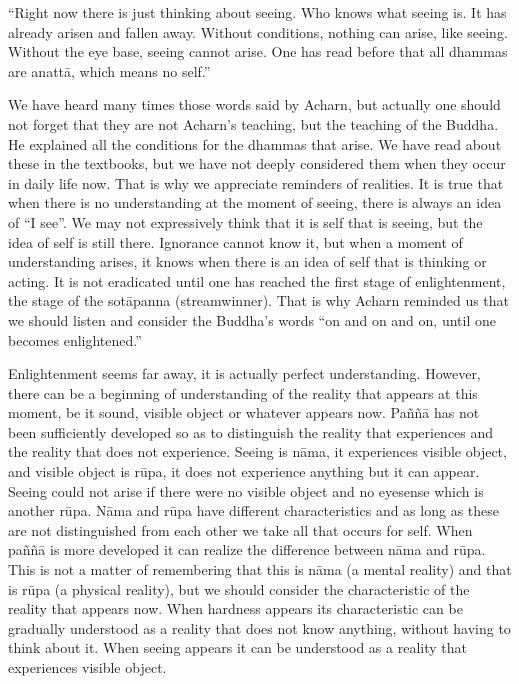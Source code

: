 ``Right now there is just thinking about seeing. Who knows what seeing
is. It has already arisen and fallen away. Without conditions, nothing
can arise, like seeing. Without the eye base, seeing cannot arise. One
has read before that all dhammas are anattā, which means no self.''

We have heard many times those words said by Acharn, but actually one
should not forget that they are not Acharn's teaching, but the teaching
of the Buddha. He explained all the conditions for the dhammas that
arise. We have read about these in the textbooks, but we have not deeply
considered them when they occur in daily life now. That is why we
appreciate reminders of realities. It is true that when there is no
understanding at the moment of seeing, there is always an idea of ``I
see''. We may not expressively think that it is self that is seeing, but
the idea of self is still there. Ignorance cannot know it, but when a
moment of understanding arises, it knows when there is an idea of self
that is thinking or acting. It is not eradicated until one has reached
the first stage of enlightenment, the stage of the sotāpanna
(streamwinner). That is why Acharn reminded us that we should listen and
consider the Buddha's words ``on and on and on, until one becomes
enlightened.''

Enlightenment seems far away, it is actually perfect understanding.
However, there can be a beginning of understanding of the reality that
appears at this moment, be it sound, visible object or whatever appears
now. Paññā has not been sufficiently developed so as to distinguish the
reality that experiences and the reality that does not experience.
Seeing is nāma, it experiences visible object, and visible object is
rūpa, it does not experience anything but it can appear. Seeing could
not arise if there were no visible object and no eyesense which is
another rūpa. Nāma and rūpa have different characteristics and as long
as these are not distinguished from each other we take all that occurs
for self. When paññā is more developed it can realize the difference
between nāma and rūpa. This is not a matter of remembering that this is
nāma (a mental reality) and that is rūpa (a physical reality), but we
should consider the characteristic of the reality that appears now. When
hardness appears its characteristic can be gradually understood as a
reality that does not know anything, without having to think about it.
When seeing appears it can be understood as a reality that experiences
visible object.

